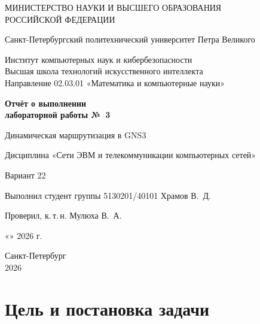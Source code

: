 \documentclass[a4paper,14pt]{extarticle}
\begin{document}
\begin{titlepage}
  \thispagestyle{empty}
  \begin{center}
    \begin{singlespace}
      МИНИСТЕРСТВО НАУКИ И ВЫСШЕГО ОБРАЗОВАНИЯ\\
      РОССИЙСКОЙ ФЕДЕРАЦИИ\par\medskip
      Санкт-Петербургский политехнический университет Петра Великого\par\medskip
      Институт компьютерных наук и кибербезопасности\\
      Высшая школа технологий искусственного интеллекта\\
      Направление 02.03.01 «Математика и компьютерные науки»
    \end{singlespace}

    \vfill
    {\Large\bfseries Отчёт о выполнении\\лабораторной работы №~3\par}
    \medskip
    {\large Динамическая маршрутизация в GNS3\par}
    \medskip
    Дисциплина «Сети ЭВМ и телекоммуникации компьютерных сетей»\par
    Вариант 22\par
  \end{center}

  \vfill
  \noindent Выполнил студент группы 5130201/40101\hfill
  \underline{\hspace{2.3cm}}\enspace Храмов В.~Д.\par\medskip
  \noindent Проверил, к.\,т.\,н.\hfill
  \underline{\hspace{2.3cm}}\enspace Мулюха В.~А.\par\medskip
  \begin{flushright}
    «\underline{\hspace{0.9cm}}» \underline{\hspace{2.6cm}} 2026 г.
  \end{flushright}

  \vfill
  \begin{center}
    Санкт-Петербург\\2026
  \end{center}
\end{titlepage}

\setcounter{page}{2}
\tableofcontents
\clearpage

\section{Цель и постановка задачи}
\end{document}
